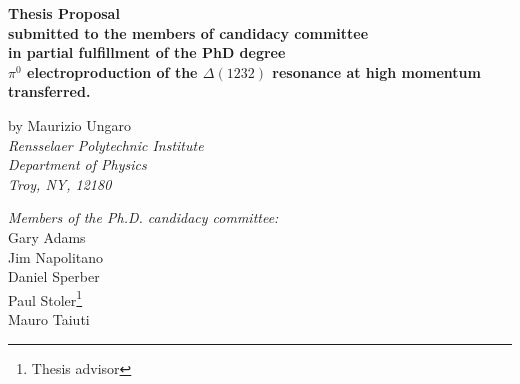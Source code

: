 \begin{center}
{\bf
 \Large Thesis Proposal \\
 

 \vspace{1cm}
 \normalsize
 submitted to the members of candidacy committee \\
 in partial fulfillment of the PhD degree \\

 \vspace{2cm}
 {
  \sec
  $\pi^0$ electroproduction of the $\Delta(1232)$ resonance at high
  momentum transferred.\\
 }




}
\vspace{1cm}
\garb
by Maurizio Ungaro \\
{\it
Rensselaer Polytechnic Institute \\
Department of Physics \\
Troy, NY, 12180 \\
}


\end{center}
\vspace{2cm}

\vspace{5cm}
\begin{center}
{\it Members of the Ph.D. candidacy committee:} \\
\vspace{1cm}
Gary Adams\\
Jim Napolitano\\
Daniel Sperber\\
Paul Stoler\footnote{Thesis advisor}\\
Mauro Taiuti
\end{center}


\newpage
